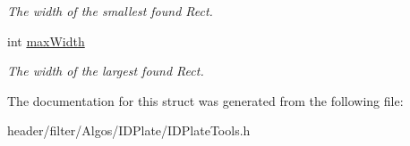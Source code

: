 \begin{DoxyCompactItemize}
\begin{DoxyCompactList}\small\item\em The width of the smallest found Rect. \end{DoxyCompactList}\item 
\mbox{\label{structfilter_1_1algos_1_1_i_d_plate_1_1_line_data_aade8f2d536b7faf9298726c5c4edcb4e}} 
int \hyperlink{structfilter_1_1algos_1_1_i_d_plate_1_1_line_data_aade8f2d536b7faf9298726c5c4edcb4e}{max\+Width}
\begin{DoxyCompactList}\small\item\em The width of the largest found Rect. \end{DoxyCompactList}\end{DoxyCompactItemize}


The documentation for this struct was generated from the following file\+:\begin{DoxyCompactItemize}
\item 
header/filter/\+Algos/\+I\+D\+Plate/I\+D\+Plate\+Tools.\+h\end{DoxyCompactItemize}
